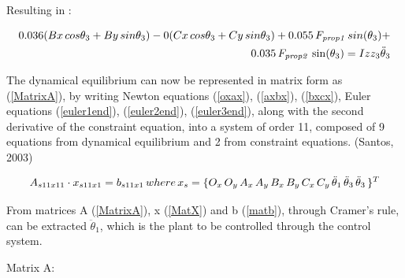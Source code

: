 Resulting in :

\begin{equation}\label{euler3end}
\begin{split}
	0.036(Bx\,cos\theta_{{3}} + By\, sin\theta_{{3}}) - 0(Cx \,cos\theta_{{3}} + Cy \,sin\theta_{{3}}) + 0.055\,F_{{\it prop1}}\,sin(\theta_{{3}}) +\\ 0.035\,F_{{\it prop2}}\,\sin (\theta_{{3}}) = Izz_{{3}}\ddot\theta_{{3}}
	\end{split}
\end{equation}
 
 The dynamical equilibrium can now be represented in matrix form as (\ref{MatrixA}), by writing Newton equations (\ref{oxax}),  (\ref{axbx}), (\ref{bxcx}), Euler equations  (\ref{euler1end}),  (\ref{euler2end}), (\ref{euler3end}), along with the second derivative of the constraint equation, into a system of order 11, composed of 9 equations from dynamical equilibrium and 2 from constraint equations. (Santos, 2003) \cite{santos2001dinamica}

 \begin{equation} \label{matA11}
{A}_{s11x11}\cdot x_{s11x1} = b_{s11x1}
\\\, where\\\, x_s = \{ O_x\, O_y\,A_x\,A_y\,B_x\,B_y\,C_x\,C_y\, \ddot\theta_1\,\ddot\theta_3\,\ddot\theta_3\, \}^T
\end{equation}
 
 From matrices A (\ref{MatrixA}), x (\ref{MatX}) and b (\ref{matb}), through Cramer's rule, can be extracted  \( \ddot\theta_1 \), which is the plant to be controlled through the control system. 

Matrix A:

